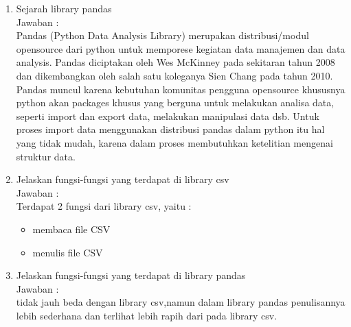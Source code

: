 \begin{enumerate}
\item Sejarah library pandas\\
Jawaban :\\
Pandas (Python Data Analysis Library) merupakan distribusi/modul opensource dari python untuk memporese kegiatan data manajemen dan data analysis. Pandas diciptakan oleh Wes McKinney pada sekitaran tahun 2008 dan dikembangkan oleh salah satu koleganya Sien Chang pada tahun 2010. Pandas muncul karena kebutuhan komunitas pengguna opensource khususnya python akan packages khusus yang berguna untuk melakukan analisa data, seperti import dan export data, melakukan manipulasi data dsb. Untuk proses import data menggunakan distribusi pandas dalam python itu hal yang tidak mudah, karena dalam proses membutuhkan ketelitian mengenai struktur data.


\item Jelaskan  fungsi-fungsi yang terdapat di library csv\\
Jawaban :\\
Terdapat 2 fungsi dari library csv, yaitu :

\begin{itemize}
\item membaca file CSV
\end{itemize}

\begin{itemize}
\item menulis file CSV
\end{itemize}


\item Jelaskan  fungsi-fungsi yang terdapat di library pandas\\
Jawaban :\\
 tidak jauh beda dengan library csv,namun dalam library pandas penulisannya lebih sederhana dan terlihat lebih rapih dari pada library csv.

\end{enumerate}
